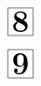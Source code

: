 \documentclass[a4paper, 10pt]{article}
\begin{document}
\thispagestyle{empty}
\begin{minipage}[t]{0.17\textwidth}
                \vspace*{-1.59cm}
        \hspace*{2.4cm}
        $\boxed{\textbf{\Huge8}}$
\end{minipage}
\begin{minipage}[t]{0.83\textwidth}
        
\end{minipage}

\thispagestyle{empty}
\begin{minipage}[t]{0.17\textwidth}
                \vspace*{-1.59cm}
        \hspace*{2.4cm}
        $\boxed{\textbf{\Huge9}}$
\end{minipage}
\begin{minipage}[t]{0.83\textwidth}
        
\end{minipage}
\end{document}
